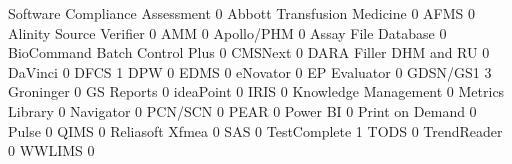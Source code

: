 \documentclass{article}
\begin{document}
\begin{Schunk}
\begin{Soutput}
                                Software Compliance Assessment
                                                             0
  Abbott Transfusion Medicine                                0
  AFMS                                                       0
  Alinity Source Verifier                                    0
  AMM                                                        0
  Apollo/PHM                                                 0
  Assay File Database                                        0
  BioCommand Batch Control Plus                              0
  CMSNext                                                    0
  DARA Filler DHM and RU                                     0
  DaVinci                                                    0
  DFCS                                                       1
  DPW                                                        0
  EDMS                                                       0
  eNovator                                                   0
  EP Evaluator                                               0
  GDSN/GS1                                                   3
  Groninger                                                  0
  GS Reports                                                 0
  ideaPoint                                                  0
  IRIS                                                       0
  Knowledge Management                                       0
  Metrics Library                                            0
  Navigator                                                  0
  PCN/SCN                                                    0
  PEAR                                                       0
  Power BI                                                   0
  Print on Demand                                            0
  Pulse                                                      0
  QIMS                                                       0
  Reliasoft Xfmea                                            0
  SAS                                                        0
  TestComplete                                               1
  TODS                                                       0
  TrendReader                                                0
  WWLIMS                                                     0
                               

\end{Soutput}
\end{Schunk}
\end{document}
